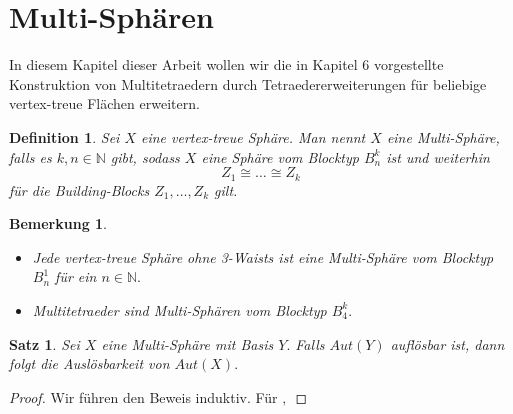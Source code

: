 \documentclass[12pt,titlepage,twoside,cleardoublepage]{article}
\theoremstyle{nummermitklammern}
\newtheorem{definition}[temp]{Definition}
\newtheorem{bemerkung}[temp]{Bemerkung}
\newtheorem{satz}[temp]{Satz}
\newtheorem{definition}[zahl]{Definition}
\newtheorem{bemerkung}[zahl]{Bemerkung}
\newtheorem{satz}[zahl]{Satz}
\numberwithin{equation}{section}
\begin{document}
\section{Multi-Sphären}
In diesem Kapitel dieser Arbeit wollen wir die in Kapitel 6 vorgestellte Konstruktion von Multitetraedern durch Tetraedererweiterungen für beliebige vertex-treue Flächen erweitern.   
\begin{definition}
Sei $X$ eine vertex-treue Sphäre. Man nennt $X$ eine \emph{Multi-Sphäre}, falls es $k,n \in \mathbb{N}$ gibt, sodass $X$ eine Sphäre vom Blocktyp $B_n^k$ ist und weiterhin
\[
Z_1\cong \ldots\cong Z_k
\]
für die Building-Blocks $Z_1,\ldots,Z_k$ gilt. 
\end{definition}
\begin{bemerkung}
\begin{itemize}
\item Jede vertex-treue Sphäre ohne 3-Waists ist eine Multi-Sphäre vom Blocktyp $B_n^1$ für ein $n\in \mathbb{N}.$
\item Multitetraeder sind Multi-Sphären vom Blocktyp $B_4^k.$
\end{itemize}
\end{bemerkung}
\begin{satz}
Sei $X$ eine Multi-Sphäre mit Basis $Y.$ Falls $Aut(Y)$ auflösbar ist, dann folgt die Auslösbarkeit von $Aut(X).$ 
\end{satz}
\begin{proof}
Wir führen den Beweis induktiv. Für $,$
\end{proof}
\end{document}
